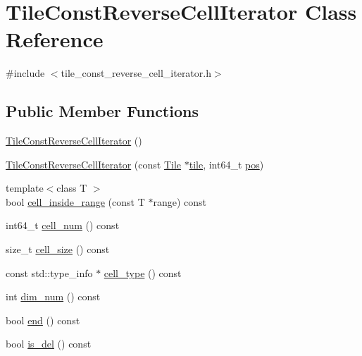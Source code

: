\hypertarget{classTileConstReverseCellIterator}{}\section{Tile\+Const\+Reverse\+Cell\+Iterator Class Reference}
\label{classTileConstReverseCellIterator}


{\ttfamily \#include $<$tile\+\_\+const\+\_\+reverse\+\_\+cell\+\_\+iterator.\+h$>$}

\subsection*{Public Member Functions}
\begin{DoxyCompactItemize}
\item 
\hyperlink{classTileConstReverseCellIterator_a7ebd7753f5b711bdb2358bf1e9ba263b}{Tile\+Const\+Reverse\+Cell\+Iterator} ()
\item 
\hyperlink{classTileConstReverseCellIterator_ab54d79a6c93268e7e6a93a941d8cc98b}{Tile\+Const\+Reverse\+Cell\+Iterator} (const \hyperlink{classTile}{Tile} $\ast$\hyperlink{classTileConstReverseCellIterator_a4431d46c5df508fb1bf4b3b3bea740b5}{tile}, int64\+\_\+t \hyperlink{classTileConstReverseCellIterator_a59f320057ccf833327c07cf193664199}{pos})
\item 
{\footnotesize template$<$class T $>$ }\\bool \hyperlink{classTileConstReverseCellIterator_a8dbb56262c7cb478d50f0182f27fcaa0}{cell\+\_\+inside\+\_\+range} (const T $\ast$range) const 
\item 
int64\+\_\+t \hyperlink{classTileConstReverseCellIterator_a120e2b33be96540b7e5de8d882d2d70c}{cell\+\_\+num} () const 
\item 
size\+\_\+t \hyperlink{classTileConstReverseCellIterator_a4953878af4d4fa1462ec6737b961af67}{cell\+\_\+size} () const 
\item 
const std\+::type\+\_\+info $\ast$ \hyperlink{classTileConstReverseCellIterator_aeb28c983940714313b68d1612c219557}{cell\+\_\+type} () const 
\item 
int \hyperlink{classTileConstReverseCellIterator_a2340388e050f559fae9e2665067ed834}{dim\+\_\+num} () const 
\item 
bool \hyperlink{classTileConstReverseCellIterator_add160cf1a41fade2ba5712198dcbdd70}{end} () const 
\item 
bool \hyperlink{classTileConstReverseCellIterator_ac0aeaf2ad5c10332c9436e4886bc2347}{is\+\_\+del} () const 

\end{DoxyCompactItemize}
